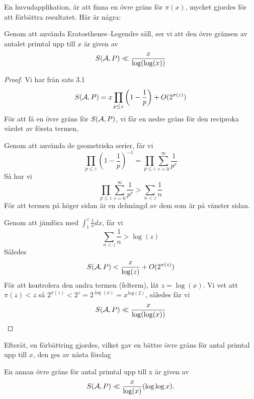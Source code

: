 En huvudapplikation, är att finna en övre gräns för $ \pi(x) $, mycket gjordes för att förbättra resultatet. Här är några:
\begin{proposition}
    Genom att använda Eratosthenes–Legendre såll, ser vi att den övre gränsen av antalet primtal upp till $ x $ är given av
\[S(\mathcal{A}, P)\ll\frac{x}{\log(\log(x))}\]
\end{proposition}
\begin{proof}
Vi har från sats 3.1
\[S(\mathcal{A}, P)=x \prod_{p\leq z}\left( 1-\frac{1}{p} \right) +O(2^{\pi(z)})\]
För att få en övre gräns för $ S(\mathcal{A}, P) $, vi får en nedre gräns för den reciproka värdet av första termen, 

Genom att använda de geometriska serier, får vi
\[\prod_{p\leq z}\left( 1-\frac{1}{p} \right)^{-1}=\prod_{p\leq z}\sum_{r=0}^{\infty}\frac{1}{p^{r}}\]
Så har vi
\[\prod_{p\leq z}\sum_{r=0}^{\infty}\frac{1}{p^{r}}>\sum_{n<z}\frac{1}{n}\]
För att termen på höger sidan är en delmängd av dem som är på vänster sidan.

Genom att jämföra med $ \int_{1}^{z}\frac{1}{x}dx $, får vi
\[\sum_{n<z}\frac{1}{n}>\log(z)\]
Således
\[S(\mathcal{A}, P)<\frac{x}{\log(z)}+O(2^{\pi(z)})\]
För att kontrolera den andra termen (felterm), låt $ z=\log(x)$. Vi vet att $ \pi(z)<z $ så $ 2^{\pi(z)}<2^{z}=2^{\log(x)}=x^{log(2)} $, således får vi
\[S(\mathcal{A}, P)\ll\frac{x}{\log(\log(x))}\]
\end{proof}
Efteråt, en förbättring gjordes, vilket gav en bättre övre gräns för antal primtal upp till $ x $, den ges av nästa förslag
\begin{proposition}
En annan övre gräns för antal primtal upp till x är given av
\[S(\mathcal{A}, P)\ll\frac{x}{\log(x)}(\log\log x).\]
\end{proposition}

